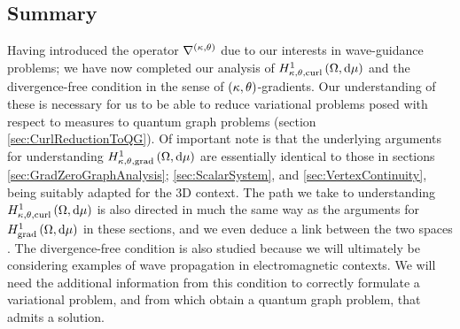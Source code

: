 \subsection{Summary}
Having introduced the operator $\nabla^{\left( \kappa, \theta \right)}$ due to our interests in wave-guidance problems; we have now completed our analysis of $H^1_{\kappa,\theta,\mathrm{curl}}\left( \Omega, \mathrm{d}\mu \right)$ and the divergence-free condition in the sense of $\left( \kappa, \theta \right)$-gradients.
Our understanding of these is necessary for us to be able to reduce variational problems posed with respect to measures to quantum graph problems (section \ref{sec:CurlReductionToQG}).
Of important note is that the underlying arguments for understanding $H^1_{\kappa,\theta,\mathrm{grad}}\left( \Omega, \mathrm{d}\mu \right)$ are essentially identical to those in sections \ref{sec:GradZeroGraphAnalysis}; \ref{sec:ScalarSystem}, and \ref{sec:VertexContinuity}, being suitably adapted for the 3D context.
The path we take to understanding $H^1_{\kappa,\theta,\mathrm{curl}}\left( \Omega, \mathrm{d}\mu \right)$ is also directed in much the same way as the arguments for $H^1_\mathrm{grad}\left( \Omega, \mathrm{d}\mu \right)$ in these sections, and we even deduce a link between the two spaces .
The divergence-free condition is also studied because we will ultimately be considering examples of wave propagation in electromagnetic contexts.
We will need the additional information from this condition to correctly formulate a variational problem, and from which obtain a quantum graph problem, that admits a solution.

